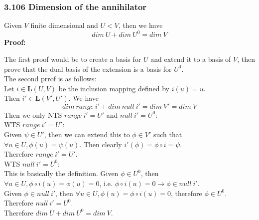 \documentclass{article}
\begin{document}
\subsubsection*{3.106 Dimension of the annihilator}
Given $V$ finite dimensional and $U < V$, then we have
\begin{equation*}
    dim\ U + dim\ U^0 = dim\ V
\end{equation*}
\textbf{Proof:}
\begin{addmargin}[1em]{0em}
    The first proof would be to create a basis for $U$ and extend it to a basis of $V$, then prove that the dual basis of the extension is a basis for $U^0$.\\
    The second prrof is as follows:\\
    Let $i \in \mathbf{L}(U, V)$ be the inclusion mapping defined by $i(u) = u$.\\
    Then $i' \in \mathbf{L}(V', U')$. We have
    \begin{equation*}
        dim\ range\ i' + dim\ null\ i' = dim\ V' = dim\ V
    \end{equation*}
    Then we only NTS $range\ i' = U'$ and $null\ i' = U^0$:\\
    WTS $range\ i' = U'$:\\
    Given $\psi \in U'$, then we can extend this to $\phi \in V'$ such that $\forall u \in U, \phi(u) = \psi(u)$. Then clearly $i'(\phi) = \phi \circ i = \psi$.\\
    Therefore $range\ i' = U'$.\\
    WTS $null\ i' = U^0$:\\
    This is basically the definition. Given $\phi \in U^0$, then $\forall u \in U, \phi \circ i(u) = \phi(u) = 0$, i.e. $\phi \circ i(u) = 0 \rightarrow \phi \in null\ i'$.\\
    Given $\phi \in null\ i'$, then $\forall u \in U, \phi(u) = \phi \circ i(u) = 0$, therefore $\phi \in U^0$.\\
    Therefore $null\ i' = U^0$.\\
    Therefore $dim\ U + dim\ U^0 = dim\ V$.
\end{addmargin}
\end{document}
